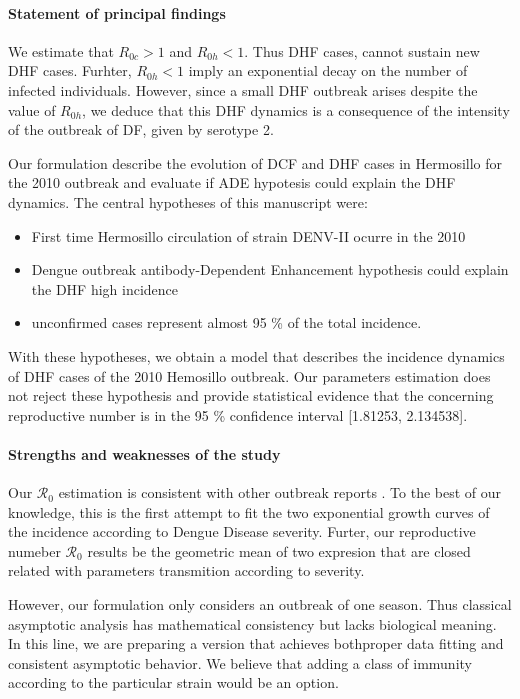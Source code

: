 \FloatBarrier
\paragraph{Statement of principal findings}
    We estimate that $R_{0c}>1$ and  $R_{0h}<1$. Thus DHF cases,
cannot sustain new DHF cases. Furhter, $R_{0h}<1$ imply an
exponential decay on the number of infected individuals. However,
since a small DHF outbreak arises despite the value of $R_{0h}$, we deduce
that this DHF dynamics is a consequence of the
intensity of the outbreak of DF, given by serotype 2.

    Our formulation describe the evolution of DCF and DHF
cases in Hermosillo for the \num{2010} outbreak and evaluate if ADE
hypotesis could explain the DHF dynamics.
The central hypotheses of this manuscript were:
    \begin{itemize}
        \item
            First time Hermosillo circulation of strain DENV-II ocurre
            in the 2010
        \item
            Dengue outbreak antibody-Dependent Enhancement hypothesis
            could explain the DHF high incidence
        \item
            unconfirmed cases represent almost 95 \% of the total
            incidence.
    \end{itemize}
    With these hypotheses, we obtain a model that describes
the incidence dynamics of DHF cases of the 2010 Hemosillo outbreak.
Our parameters estimation does not reject these hypothesis and provide
statistical evidence that the concerning reproductive number is in the
\num{95} \% confidence interval {[\num{1.81253}, \num{2.134538}]}.
%
%
\paragraph{Strengths and weaknesses of the study}
    Our $\mathcal{R}_0$ estimation is consistent with other outbreak reports
\cite{Khan2014}.
To the best of our knowledge, this is the first attempt to fit the
two exponential growth curves of the incidence according to Dengue
Disease severity.  Furter, our reproductive numeber $\mathcal{R}_0$
results be the geometric mean of two expresion that are closed related
with parameters transmition according to severity.

    However, our formulation only considers an outbreak
of one season. Thus classical asymptotic analysis has mathematical
consistency but lacks biological meaning.  In this line, we are preparing
a version that achieves both\textemdash proper data fitting and consistent
asymptotic behavior. We believe that adding a class of immunity according
to the particular strain would be an option.


